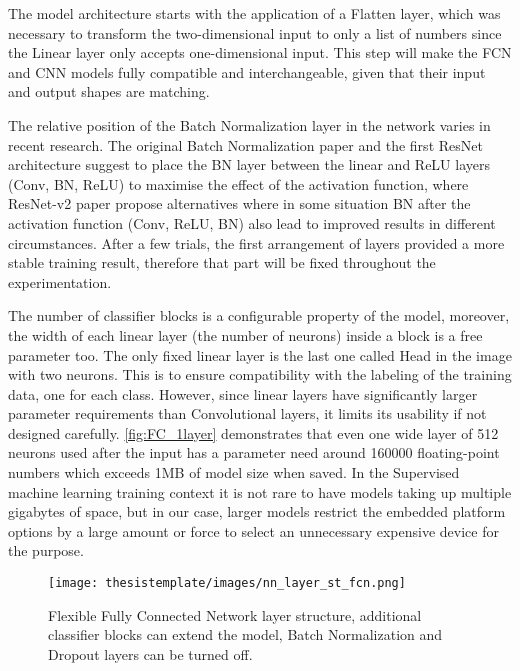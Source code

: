 The model architecture starts with the application of a Flatten layer, which was necessary to transform the two-dimensional input to only a list of numbers since the Linear layer only accepts one-dimensional input. This step will make the FCN and CNN models fully compatible and interchangeable, given that their input and output shapes are matching.

The relative position of the Batch Normalization layer in the network varies in recent research. The original Batch Normalization paper \cite{ioffe2015batch} and the first ResNet \cite{he2015deep_resnet} architecture suggest to place the BN layer between the linear and ReLU layers (Conv, BN, ReLU) to maximise the effect of the activation function, where ResNet-v2 paper \cite{he2016identity_resnet_v2} propose alternatives where in some situation BN after the activation function (Conv, ReLU, BN) also lead to improved results in different circumstances. After a few trials, the first arrangement of layers provided a more stable training result, therefore that part will be fixed throughout the experimentation.


The number of classifier blocks is a configurable property of the model, moreover, the width of each linear layer (the number of neurons)  inside a block is a free parameter too. The only fixed linear layer is the last one called Head in the image with two neurons. This is to ensure compatibility with the labeling of the training data, one for each class. However, since linear layers have significantly larger parameter requirements than Convolutional layers, it limits its usability if not designed carefully. \autoref{fig:FC_1layer} demonstrates that even one wide layer of 512 neurons used after the input has a parameter need around 160000 floating-point numbers which exceeds 1MB of model size when saved. In the Supervised machine learning training context it is not rare to have models taking up multiple gigabytes of space, but in our case, larger models restrict the embedded platform options by a large amount or force to select an unnecessary expensive device for the purpose.


\begin{figure}[ht!]
  \begin{center}
    \texttt{[image: thesistemplate/images/nn\_layer\_st\_fcn.png]}
    \caption{Flexible Fully Connected Network layer structure, additional classifier blocks can extend the model, Batch Normalization and Dropout layers can be turned off.}
    \label{fig:FC_structure}
  \end{center}
\end{figure}



